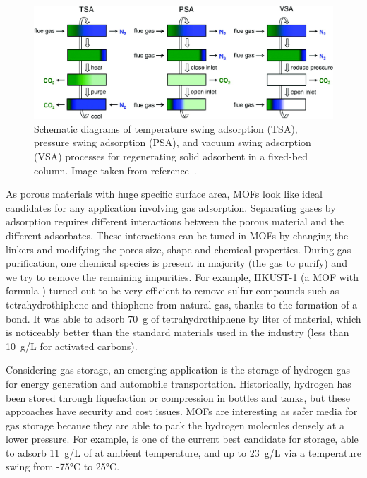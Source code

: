 \documentclass[thesis]{subfiles}
\begin{document}
\begin{figure}[ht]
    \centering
    \includegraphics[width=\textwidth]{figures/cited/adsorption-processes}
    \caption{Schematic diagrams of temperature swing adsorption (TSA),
    pressure swing adsorption (PSA), and vacuum swing adsorption (VSA)
    processes for regenerating solid adsorbent in a fixed-bed column.
    Image taken from reference~\cite{Sumida2011}.}
    \label{fig:adsorption-processes}
\end{figure}

As porous materials with huge specific surface area, MOFs look like ideal
candidates for any application involving gas adsorption. Separating gases by
adsorption requires different interactions between the porous material and the
different adsorbates. These interactions can be tuned in MOFs by changing the
linkers and modifying the pores size, shape and chemical properties. During gas
purification, one chemical species is present in majority (the gas to purify) and
we try to remove the remaining impurities. For example, HKUST-1 (a MOF with
formula ) turned out to be very efficient to remove sulfur
compounds such as tetrahydrothiphene and thiophene from natural gas, thanks to
the formation of a  bond\cite{Mueller2006}. It was able to adsorb
\SI{70}{g} of tetrahydrothiphene by liter of material, which is noticeably
better than the standard materials used in the industry (less than \SI{10}{g/L}
for activated carbons).

Considering gas storage, an emerging application is the storage of hydrogen gas
for energy generation and automobile transportation. Historically, hydrogen has
been stored through liquefaction or compression in bottles and tanks, but these
approaches have security and cost issues. MOFs are interesting as safer media
for gas storage because they are able to pack the hydrogen molecules densely at
a lower pressure. For example,  is one of the current
best candidate for  storage, able to adsorb \SI{11}{g/L} of  at
ambient temperature, and up to \SI{23}{g/L} via a temperature swing from -75°C
to 25°C\cite{Kapelewski2018}.
\end{document}
